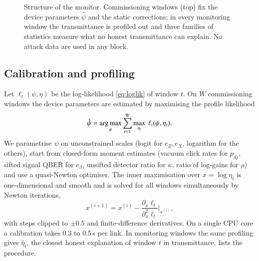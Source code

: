 \begin{figure}[!tbp]
{}
\caption{Structure of the \qtrace{} monitor. Commissioning windows (top) fix the device parameters $\hat\psi$ and the static corrections; in every monitoring window the transmittance is profiled out and three families of statistics measure what no honest transmittance can explain. No attack data are used in any block.}
\label{fig:pipeline}
\end{figure}

\subsection{Calibration and profiling}\label{sec:calibration}

Let $\ell_t(\psi,\eta)$ be the log-likelihood \eqref{eq:loglik} of window $t$. On $W$ commissioning windows the device parameters are estimated by maximising the profile likelihood
\begin{equation}
\hat\psi = \operatorname*{arg\,max}_\psi \sum_{t=1}^{W} \max_{\eta_t}\ \ell_t(\psi,\eta_t). \label{eq:calib}
\end{equation}
We parametrise $\psi$ on unconstrained scales (logit for $e_Z,e_X$, logarithm for the others), start from closed-form moment estimates (vacuum click rates for $p_{dj}$, sifted signal QBER for $e_\beta$, unsifted detector ratio for $\kappa$, ratio of log-gains for $\rho$) and use a quasi-Newton optimiser. The inner maximisation over $x=\log\eta_t$ is one-dimensional and smooth and is solved for all windows simultaneously by Newton iterations,
\begin{equation}
x^{(i+1)} = x^{(i)} - \frac{\partial_x\ell_t}{\partial_x^2\ell_t}\bigg|_{x^{(i)}}, \label{eq:newton}
\end{equation}
with steps clipped to $\pm0.5$ and finite-difference derivatives. On a single CPU core a calibration takes 0.3 to 0.5\,s per link. In monitoring windows the same profiling gives $\hat\eta_t$, the closest honest explanation of window $t$ in transmittance.  lists the procedure.

